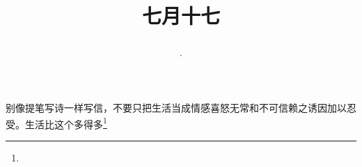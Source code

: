 \title{\date[d=20,m=8,y=2024][year:cn-y,年,month:cn,day:cn,日,·,weekday]·七月十七 }
别像提笔写诗一样写信，不要只把生活当成情感喜怒无常和不可信赖之诱因加以忍受。生活比这个多得多\footnote{ }

